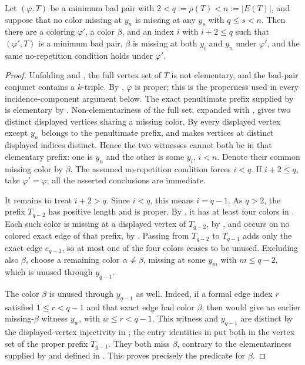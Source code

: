 \begin{helper}
Let \((\varphi,T)\) be a minimum bad pair with
\(2<q:=\rho(T)<n:=|E(T)|\), and suppose that no color missing at
\(y_n\) is missing at any \(y_s\) with \(q\le s<n\).  Then there are a
coloring \(\varphi'\), a color \(\beta\), and an index \(i\) with
\(i+2\le q\) such that \((\varphi',T)\) is a minimum bad pair,
\(\beta\) is missing at both \(y_i\) and \(y_n\) under \(\varphi'\),
and the same no-repetition condition holds under \(\varphi'\).
\end{helper}
\begin{proof}
Unfolding  and
, the full vertex set of \(T\) is not
elementary, and the bad-pair conjunct contains a \(k\)-triple.
By , \(\varphi\) is proper; this is the properness used
in every incidence-component argument below.  The exact penultimate
prefix supplied by  is elementary by
.  Non-elementariness of the
full set, expanded with , gives two
distinct displayed vertices sharing a missing color.  By
 every displayed vertex except \(y_n\)
belongs to the penultimate prefix, and  makes
vertices at distinct displayed indices distinct.  Hence the two
witnesses cannot both be in that elementary prefix: one is \(y_n\) and
the other is some \(y_i\), \(i<n\).  Denote their common missing color
by \(\beta\).  The assumed no-repetition condition forces \(i<q\).
If \(i+2\le q\), take \(\varphi'=\varphi\); all the asserted
conclusions are immediate.

It remains to treat \(i+2>q\).  Since \(i<q\), this means
\(i=q-1\).  As \(q>2\), the prefix \(T_{q-2}\) has positive length and
is proper.  By , it has at least four
colors in .  Each such color is missing at a
displayed vertex of \(T_{q-2}\), by
, and occurs on no colored exact edge of that
prefix, by .  Passing from \(T_{q-2}\) to
\(T_{q-1}\) adds only the exact edge \(e_{q-1}\), so at most one of the
four colors ceases to be unused.  Excluding also \(\beta\), choose a
remaining color \(\alpha\ne\beta\), missing at some \(y_m\) with
\(m\le q-2\), which is unused through \(y_{q-1}\).

The color \(\beta\) is unused through \(y_{q-1}\) as well.  Indeed, if
a formal edge index \(r\) satisfied \(1\le r<q-1\) and that exact edge
had color \(\beta\), then  would give an earlier
missing-\(\beta\) witness \(y_w\), with \(w\le r<q-1\).  This witness
and \(y_{q-1}\) are distinct by the displayed-vertex injectivity in
; the entry identities in
 put both in the vertex set
 of the proper prefix \(T_{q-1}\).
They both miss \(\beta\), contrary to the elementariness supplied by
 and defined in
.  This proves precisely the
predicate  for \(\beta\).


\end{proof}
